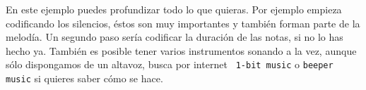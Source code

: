 En este ejemplo puedes profundizar todo lo que quieras. Por ejemplo empieza codificando los
silencios, éstos son muy importantes y también forman parte de la melodía. Un segundo paso sería
codificar la duración de las notas, si no lo has hecho ya. También es posible tener varios
instrumentos sonando a la vez, aunque sólo dispongamos de un altavoz, busca por internet {\tt
1-bit music} o {\tt beeper music} si quieres saber cómo se hace.

\chapterend{}
